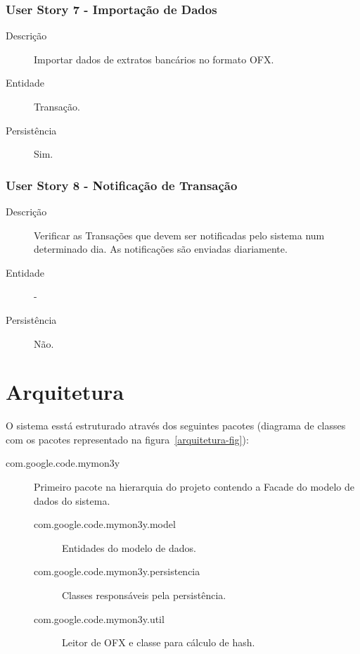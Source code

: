 \documentclass[12pt]{article}
\begin{document}
\subsubsection{User Story 7 - Importação de Dados}

\begin{description}
 \item [Descrição] Importar dados de extratos bancários no formato OFX. 
 \item [Entidade] Transação.
 \item [Persistência] Sim.
\end{description}

\subsubsection{User Story 8 - Notificação de Transação}

\begin{description}
 \item [Descrição] Verificar as Transações que devem ser notificadas pelo sistema num determinado dia. As notificações são enviadas diariamente.
 \item [Entidade] -
 \item [Persistência] Não.
\end{description}

\section{Arquitetura}
\label{arquitetura}

O sistema esstá estruturado através dos seguintes pacotes (diagrama de classes com os pacotes representado na figura~\ref{arquitetura-fig}):

\begin{description}
 \item [com.google.code.mymon3y] Primeiro pacote na hierarquia do projeto contendo a Facade do modelo de dados do sistema.
 \begin{description}
     \item [com.google.code.mymon3y.model] Entidades do modelo de dados.
     \item [com.google.code.mymon3y.persistencia] Classes responsáveis pela persistência.
     \item [com.google.code.mymon3y.util] Leitor de OFX e classe para cálculo de hash.
 \end{description}
\end{description}
\end{document}
